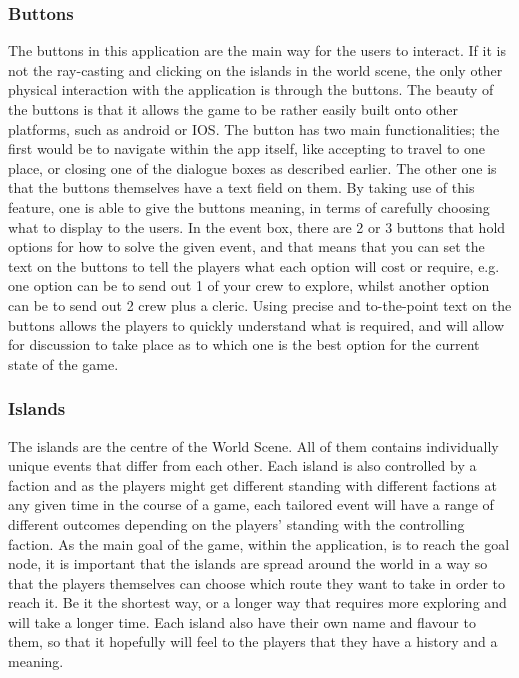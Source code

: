 \subsubsection{Buttons}	
The buttons in this application are the main way for the users to interact. If it is not the ray-casting and clicking on the islands in the world scene, the only other physical interaction with the application is through the buttons. The beauty of the buttons is that it allows the game to be rather easily built onto other platforms, such as android or IOS. The button has two main functionalities; the first would be to navigate within the app itself, like accepting to travel to one place, or closing one of the dialogue boxes as described earlier. The other one is that the buttons themselves have a text field on them. By taking use of this feature, one is able to give the buttons meaning, in terms of carefully choosing what to display to the users. In the event box, there are 2 or 3 buttons that hold options for how to solve the given event, and that means that you can set the text on the buttons to tell the players what each option will cost or require, e.g. one option can be to send out 1 of your crew to explore, whilst another option can be to send out 2 crew plus a cleric. Using precise and to-the-point text on the buttons allows the players to quickly understand what is required, and will allow for discussion to take place as to which one is the best option for the current state of the game.

\subsubsection{Islands}
The islands are the centre of the World Scene. All of them contains individually unique events that differ from each other. Each island is also controlled by a faction and as the players might get different standing with different factions at any given time in the course of a game, each tailored event will have a range of different outcomes depending on the players' standing with the controlling faction. 
As the main goal of the game, within the application, is to reach the goal node, it is important that the islands are spread around the world in a way so that the players themselves can choose which route they want to take in order to reach it. Be it the shortest way, or a longer way that requires more exploring and will take a longer time. Each island also have their own name and flavour to them, so that it hopefully will feel to the players that they have a history and a meaning.

